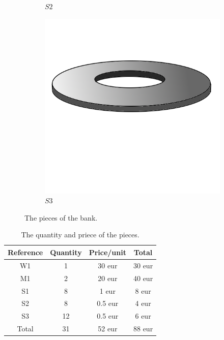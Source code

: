 \documentclass{subfiles}
\begin{document}
\begin{figure}[ht]
\begin{subfigure}[b]{0.3\textwidth}
            \caption{$S2$}
            \label{fig:S2}
        \end{subfigure}
        \hfill
        \begin{subfigure}[b]{0.3\textwidth}
            \centering
            \includegraphics[width=\textwidth]{Ressources/Piece_S3.png}
            \caption{$S3$}
            \label{fig:S3}
        \end{subfigure}
           \caption{The pieces of the bank.}
           \label{fig:Pieces}
   \end{figure}
   \begin{table}
    \centering
        \begin{tabular}[ht]{|c|c|c|c|}
            \hline
           Reference & Quantity & Price/unit & Total \\\hline\hline
            W1 & 1 & 30 eur & 30 eur \\\hline
            M1 & 2 & 20 eur & 40 eur \\\hline
            S1 & 8 & 1 eur & 8 eur \\\hline
            S2 & 8 & 0.5 eur & 4 eur \\\hline
            S3 & 12 & 0.5 eur & 6 eur \\\hline\hline
            Total & 31 & 52 eur & 88 eur \\\hline
        \end{tabular}
        \label{tab:Pieces}
        \caption{The quantity and priece of the pieces.}
   \end{table}

\end{document}
